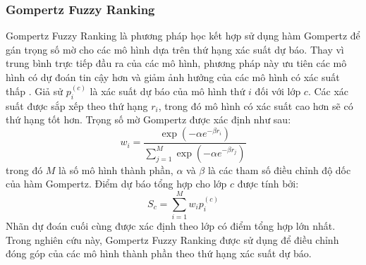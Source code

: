 \documentclass[10pt,twoside]{article}
\begin{document}
\subsubsection{Gompertz Fuzzy Ranking} 
Gompertz Fuzzy Ranking là phương pháp học kết hợp sử dụng hàm Gompertz để gán trọng số mờ cho các mô hình dựa trên thứ hạng xác suất dự báo. Thay vì trung bình trực tiếp đầu ra của các mô hình, phương pháp này ưu tiên các mô hình có dự đoán tin cậy hơn và giảm ảnh hưởng của các mô hình có xác suất thấp \cite{kundu_fuzzy_2021}. Giả sử $p_i^{(c)}$ là xác suất dự báo của mô hình thứ $i$ đối với lớp $c$. Các xác suất được sắp xếp theo thứ hạng $r_i$, trong đó mô hình có xác suất cao hơn sẽ có thứ hạng tốt hơn. Trọng số mờ Gompertz được xác định như sau: 
\begin{equation} 
w_i = \frac{\exp \left(-\alpha e^{-\beta r_i}\right)} {\sum_{j=1}^{M} \exp \left(-\alpha e^{-\beta r_j}\right)} 
\end{equation} 
trong đó $M$ là số mô hình thành phần, $\alpha$ và $\beta$ là các tham số điều chỉnh độ dốc của hàm Gompertz. Điểm dự báo tổng hợp cho lớp $c$ được tính bởi: 
\begin{equation} 
S_c = \sum_{i=1}^{M} w_i p_i^{(c)} 
\end{equation} 
Nhãn dự đoán cuối cùng được xác định theo lớp có điểm tổng hợp lớn nhất. Trong nghiên cứu này, Gompertz Fuzzy Ranking được sử dụng để điều chỉnh đóng góp của các mô hình thành phần theo thứ hạng xác suất dự báo.
\end{document}
